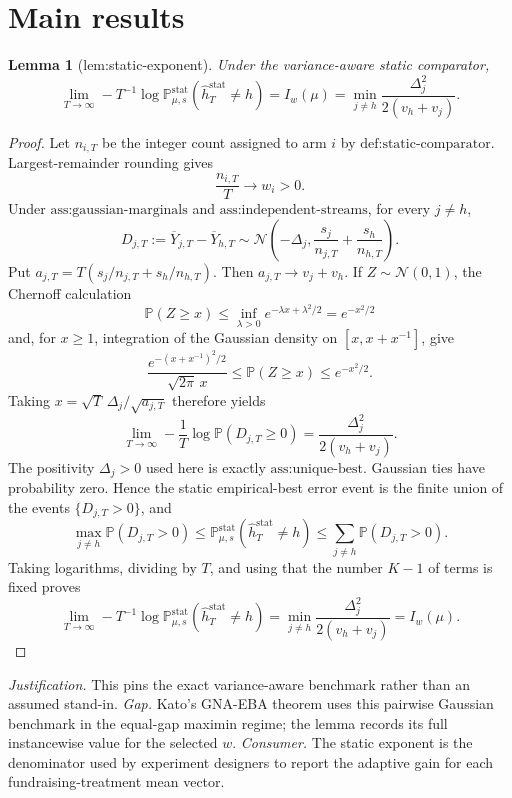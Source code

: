 \documentclass{article}
\newtheorem{lemma}{Lemma}
\begin{document}
\section{Main results}

\begin{lemma}[lem:static-exponent]\label{lem:static-exponent}
Under the variance-aware static comparator, \[\lim_{T\to\infty}-T^{-1}\log\mathbb P_{\mu,s}^{\mathrm{stat}}(\widehat h_T^{\mathrm{stat}}\ne h)=I_w(\mu)=\min_{j\ne h}\frac{\Delta_j^2}{2(v_h+v_j)}.\]
\end{lemma}
\begin{proof}
Let \(n_{i,T}\) be the integer count assigned to arm \(i\) by \(\text{def:static-comparator}\).  Largest-remainder rounding gives
\[
 \frac{n_{i,T}}{T}\longrightarrow w_i>0.
\]
Under \(\text{ass:gaussian-marginals}\) and \(\text{ass:independent-streams}\), for every \(j\ne h\),
\[
 D_{j,T}:=\overline Y_{j,T}-\overline Y_{h,T}
 \sim \mathcal N\!\left(-\Delta_j,\frac{s_j}{n_{j,T}}+\frac{s_h}{n_{h,T}}\right).
\]
Put \(a_{j,T}=T(s_j/n_{j,T}+s_h/n_{h,T})\).  Then \(a_{j,T}\to v_j+v_h\).  If \(Z\sim\mathcal N(0,1)\), the Chernoff calculation
\[
 \mathbb P(Z\ge x)\le \inf_{\lambda>0}e^{-\lambda x+\lambda^2/2}=e^{-x^2/2}
\]
and, for \(x\ge1\), integration of the Gaussian density on \([x,x+x^{-1}]\), give
\[
 \frac{e^{-(x+x^{-1})^2/2}}{\sqrt{2\pi}\,x}
 \le \mathbb P(Z\ge x)\le e^{-x^2/2}.
\]
Taking \(x=\sqrt T\,\Delta_j/\sqrt{a_{j,T}}\) therefore yields
\[
 \lim_{T\to\infty}-\frac1T\log\mathbb P(D_{j,T}\ge0)
 =\frac{\Delta_j^2}{2(v_h+v_j)}.
\]
The positivity \(\Delta_j>0\) used here is exactly \(\text{ass:unique-best}\).  Gaussian ties have probability zero.  Hence the static empirical-best error event is the finite union of the events \(\{D_{j,T}>0\}\), and
\[
 \max_{j\ne h}\mathbb P(D_{j,T}>0)
 \le \mathbb P_{\mu,s}^{\mathrm{stat}}(\widehat h_T^{\mathrm{stat}}\ne h)
 \le \sum_{j\ne h}\mathbb P(D_{j,T}>0).
\]
Taking logarithms, dividing by \(T\), and using that the number \(K-1\) of terms is fixed proves
\[
 \lim_{T\to\infty}-T^{-1}\log\mathbb P_{\mu,s}^{\mathrm{stat}}(\widehat h_T^{\mathrm{stat}}\ne h)
 =\min_{j\ne h}\frac{\Delta_j^2}{2(v_h+v_j)}=I_w(\mu).
\]
\end{proof}
\par\smallskip\noindent \textit{Justification.} This pins the exact variance-aware benchmark rather than an assumed stand-in. \textit{Gap.} Kato's GNA-EBA theorem uses this pairwise Gaussian benchmark in the equal-gap maximin regime; the lemma records its full instancewise value for the selected \(w\). \textit{Consumer.} The static exponent is the denominator used by experiment designers to report the adaptive gain for each fundraising-treatment mean vector.
\end{document}
